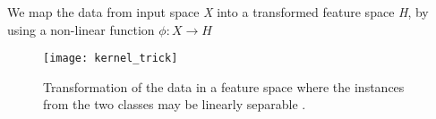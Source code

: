We map the data from input space \textit{X} into a transformed feature space \textit{H}, by using a non-linear function $\phi: X \rightarrow H$

\begin{figure}[H]
	\centering
	\texttt{[image: kernel\_trick]}
	\caption{Transformation of the data in a feature space where the instances from the two classes may be linearly separable \cite{kernel_trick}.}
\end{figure} 

\clearpage

